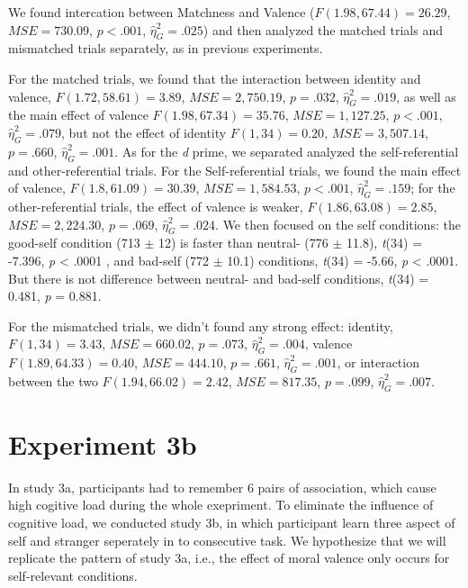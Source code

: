 \documentclass[man]{apa6}
\begin{document}
We found intercation between Matchness and Valence (\(F(1.98, 67.44) = 26.29\), \(\mathit{MSE} = 730.09\), \(p < .001\), \(\hat{\eta}^2_G = .025\)) and then analyzed the matched trials and mismatched trials separately, as in previous experiments.

For the matched trials, we found that the interaction between identity and valence, \(F(1.72, 58.61) = 3.89\), \(\mathit{MSE} = 2,750.19\), \(p = .032\), \(\hat{\eta}^2_G = .019\), as well as the main effect of valence \(F(1.98, 67.34) = 35.76\), \(\mathit{MSE} = 1,127.25\), \(p < .001\), \(\hat{\eta}^2_G = .079\), but not the effect of identity \(F(1, 34) = 0.20\), \(\mathit{MSE} = 3,507.14\), \(p = .660\), \(\hat{\eta}^2_G = .001\). As for the \emph{d} prime, we separated analyzed the self-referential and other-referential trials. For the Self-referential trials, we found the main effect of valence, \(F(1.8, 61.09) = 30.39\), \(\mathit{MSE} = 1,584.53\), \(p < .001\), \(\hat{\eta}^2_G = .159\); for the other-referential trials, the effect of valence is weaker, \(F(1.86, 63.08) = 2.85\), \(\mathit{MSE} = 2,224.30\), \(p = .069\), \(\hat{\eta}^2_G = .024\). We then focused on the self conditions: the good-self condition (713 \(\pm\) 12) is faster than neutral- (776 \(\pm\) 11.8), \emph{t}(34) = -7.396, \emph{p} \textless{} .0001 , and bad-self (772 \(\pm\) 10.1) conditions, \emph{t}(34) = -5.66, \emph{p} \textless{} .0001. But there is not difference between neutral- and bad-self conditions, \emph{t}(34) = 0.481, \emph{p} = 0.881.

For the mismatched trials, we didn't found any strong effect: identity, \(F(1, 34) = 3.43\), \(\mathit{MSE} = 660.02\), \(p = .073\), \(\hat{\eta}^2_G = .004\), valence \(F(1.89, 64.33) = 0.40\), \(\mathit{MSE} = 444.10\), \(p = .661\), \(\hat{\eta}^2_G = .001\), or interaction between the two \(F(1.94, 66.02) = 2.42\), \(\mathit{MSE} = 817.35\), \(p = .099\), \(\hat{\eta}^2_G = .007\).

\hypertarget{experiment-3b}{%
\section{Experiment 3b}\label{experiment-3b}}

In study 3a, participants had to remember 6 pairs of association, which cause high cogitive load during the whole exepriment. To eliminate the influence of cognitive load, we conducted study 3b, in which participant learn three aspect of self and stranger seperately in to consecutive task. We hypothesize that we will replicate the pattern of study 3a, i.e., the effect of moral valence only occurs for self-relevant conditions.
\end{document}

